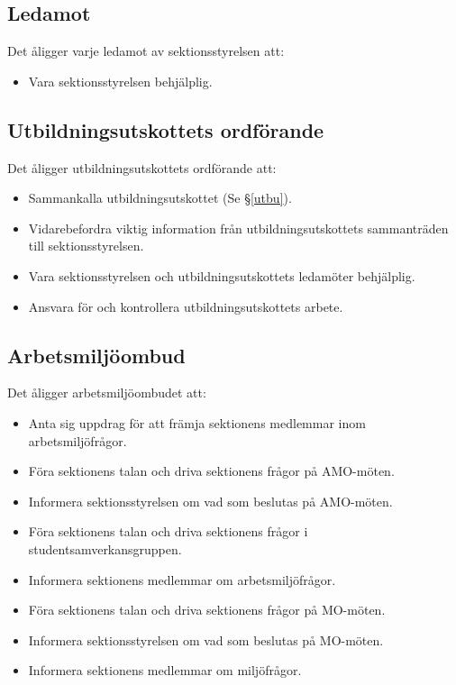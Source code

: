 \documentclass{datateknologsektionen-document}
\begin{document}
\subsection{Ledamot}
\label{ledamot}
Det åligger varje ledamot av sektionsstyrelsen att:
\begin{itemize}
  \item Vara sektionsstyrelsen behjälplig.
\end{itemize}

\subsection{Utbildningsutskottets ordförande}
\label{utbuordf}
Det åligger utbildningsutskottets ordförande att:
\begin{itemize}
  \item Sammankalla utbildningsutskottet (Se \S \ref{utbu}).
  \item Vidarebefordra viktig information från utbildningsutskottets sammanträden till sektionsstyrelsen.
  \item Vara sektionsstyrelsen och utbildningsutskottets ledamöter behjälplig.
  \item Ansvara för och kontrollera utbildningsutskottets arbete.
\end{itemize}

\subsection{Arbetsmiljöombud}
\label{amo}
Det åligger arbetsmiljöombudet att:
\begin{itemize}
  \item Anta sig uppdrag för att främja sektionens medlemmar inom arbetsmiljöfrågor.
  \item Föra sektionens talan och driva sektionens frågor på AMO-möten.
  \item Informera sektionsstyrelsen om vad som beslutas på AMO-möten.
  \item Föra sektionens talan och driva sektionens frågor i studentsamverkansgruppen.
  \item Informera sektionens medlemmar om arbetsmiljöfrågor.
  \item Föra sektionens talan och driva sektionens frågor på MO-möten.
  \item Informera sektionsstyrelsen om vad som beslutas på MO-möten.
  \item Informera sektionens medlemmar om miljöfrågor.
\end{itemize}
\end{document}
